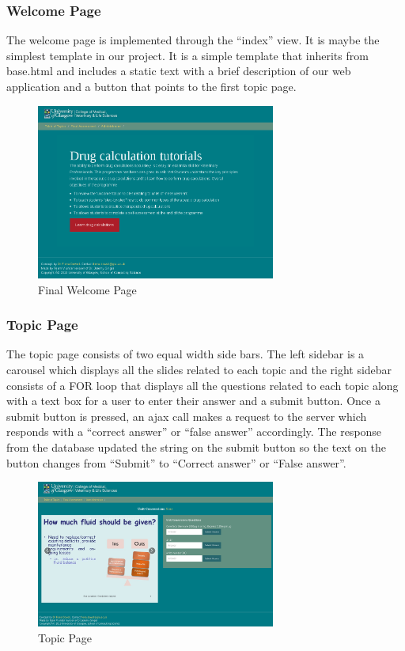 \documentclass{l3proj}
\begin{document}
\subsubsection{Welcome Page}
The welcome page is implemented through the “index” view.  It is maybe the simplest template in our project. It is a simple template that inherits from base.html and includes a static text with a brief description of our web application and a button that points to the first topic page.
\begin{figure}[h!]
   \caption{Final Welcome Page}
   \centering
     \includegraphics[width=0.7\textwidth]{images/welcomePage.png}
\end{figure} 

\subsubsection{Topic Page}
The topic page consists of two equal width side bars. The left sidebar is a carousel which displays all the slides related to each topic and the right sidebar  consists of a FOR loop that displays all the questions related to each topic along with a text box for a user to enter their answer and a submit button. Once a submit button is pressed, an ajax call makes a request to the server which responds with a “correct answer” or “false answer” accordingly.  The response from the database updated the string on the submit button so the text on the button changes from “Submit” to “Correct answer” or “False answer”.
\begin{figure}[h!]
   \caption{Topic Page}
   \centering
     \includegraphics[width=0.7\textwidth]{images/topicPage.png}
\end{figure} 
\end{document}
